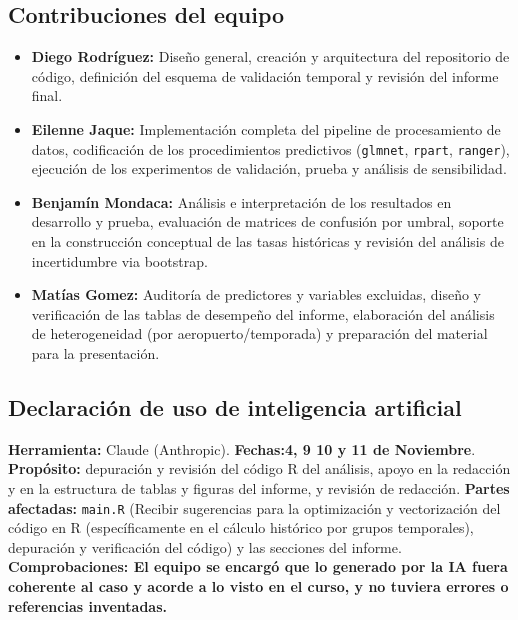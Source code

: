 \documentclass[11pt,a4paper]{article}
\newcommand{\code}[1]{\texttt{#1}}
\begin{document}
\subsection*{Contribuciones del equipo}
\begin{itemize}
    \item \textbf{Diego Rodríguez:} Diseño general, creación y arquitectura del repositorio de código, definición del esquema de validación temporal y revisión del informe final.
    \item \textbf{Eilenne Jaque:} Implementación completa del pipeline de procesamiento de datos, codificación de los procedimientos predictivos (\texttt{glmnet}, \texttt{rpart}, \texttt{ranger}), ejecución de los experimentos de validación, prueba y análisis de sensibilidad.
    \item \textbf{Benjamín Mondaca:} Análisis e interpretación de los resultados en desarrollo y prueba, evaluación de matrices de confusión por umbral, soporte en la construcción conceptual de las tasas históricas y revisión del análisis de incertidumbre via bootstrap.
    \item \textbf{Matías Gomez:} Auditoría de predictores y variables excluidas, diseño y verificación de las tablas de desempeño del informe, elaboración del análisis de heterogeneidad (por aeropuerto/temporada) y preparación del material para la presentación.
\end{itemize}
\subsection*{Declaración de uso de inteligencia artificial}
 
\textbf{Herramienta:} Claude (Anthropic). \textbf{Fechas:4, 9 10 y 11 de Noviembre}. \textbf{Propósito:} depuración y revisión del código R del análisis, apoyo en la redacción y en la estructura de tablas y figuras del informe, y revisión de redacción. \textbf{Partes afectadas:} \code{main.R} (Recibir sugerencias para la optimización y vectorización del código en R (específicamente en el cálculo histórico por grupos temporales), depuración y verificación del código) y las secciones del informe. \textbf{Comprobaciones: El equipo se encargó que lo generado por la IA fuera coherente al caso y acorde a lo visto en el curso, y no tuviera errores o referencias inventadas.} 
 
\end{document}
